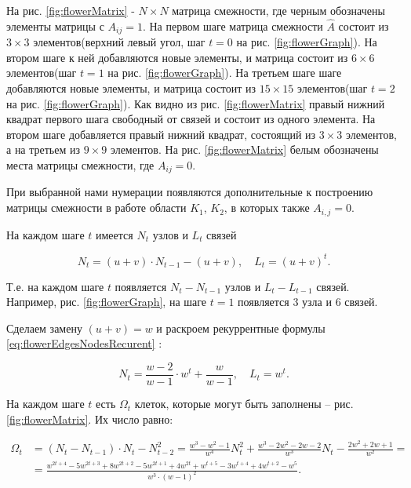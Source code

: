 \documentclass[10pt,aps,pra]{revtex4-1}
\begin{document}
        На рис. \ref{fig:flowerMatrix} - $N \times N$ матрица смежности, где черным обозначены элементы матрицы с $A_{ij}=1$. На первом шаге матрица смежности $\hat{A}$ состоит из $3 \times 3$ элементов(верхний левый угол, шаг $t=0$ на рис. \ref{fig:flowerGraph}). На втором шаге к ней добавляются новые элементы, и матрица состоит из $6 \times 6$ элементов(шаг $t=1$ на рис. \ref{fig:flowerGraph}). На третьем шаге шаге добавляются новые элементы, и матрица состоит из $15 \times 15$ элементов(шаг $t=2$ на рис. \ref{fig:flowerGraph}). Как видно из рис. \ref{fig:flowerMatrix} правый нижний квадрат первого шага свободный от связей и состоит из одного элемента. На втором шаге добавляется правый нижний квадрат, состоящий из $3 \times 3$ элементов, а на третьем из $9 \times 9$ элементов. На рис. \ref{fig:flowerMatrix} белым обозначены места матрицы смежности, где $A_{ij}=0$.

        При выбранной нами нумерации появляются дополнительные к построению матрицы смежности в работе \cite{Dor1} области $K_1$, $K_2$, в которых также $A_{i,j}=0$. 

        На каждом шаге $t$ имеется $N_t$ узлов и $L_t$ связей \cite{Rozenfeld1}

            \begin{equation}
                \label{eq:flowerEdgesNodesRecurent}
                N_t = (u+v) \cdot N_{t-1}-(u+v), \quad L_t=(u+v)^t.
            \end{equation}

        Т.е. на каждом шаге $t$ появляется $N_t-N_{t-1}$ узлов и $L_t-L_{t-1}$ связей. Например, рис. \ref{fig:flowerGraph}, на шаге $t=1$ появляется 3 узла и 6 связей.

        Сделаем замену $(u+v)=w$ и раскроем рекуррентные формулы \ref{eq:flowerEdgesNodesRecurent} \cite{Rozenfeld1}:

            \begin{equation}
                \label{eq:flowerEdgesNodesOpenRecurent}
                N_t = \frac{w-2}{w-1} \cdot w^t+\frac{w}{w-1}, \quad L_t=w^t.
            \end{equation}

        На каждом шаге $t$ есть $\Omega_t$ клеток, которые могут быть заполнены – рис. \ref{fig:flowerMatrix}. Их число равно:

            \begin{equation}
                \label{eq:flowerEmpty}
                \begin{split}
                \Omega_{t} &=(N_t-N_{t-1}) \cdot N_t-N_{t-2}^2 = \frac{w^3-w^2-1}{w^4}N_t^2 + \frac{w^3-2w^2-2w-2}{w^3}N_t-\frac{2w^2+2w+1}{w^2} = \\
                           &= \frac{w^{2t+4}-5w^{2t+3}+8w^{2t+2}-5w^{2t+1}+4w^{2t}+w^{t+5}-3w^{t+4}+4w^{t+2}-w^5}{w^{3} \cdot (w-1)^2}.
                \end{split}
            \end{equation}
\end{document}
